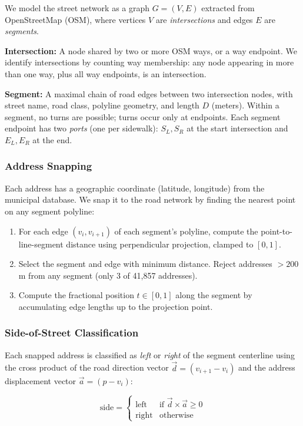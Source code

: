 \documentclass[conference]{IEEEtran}
\begin{document}
We model the street network as a graph $G = (V, E)$ extracted from OpenStreetMap (OSM), where vertices $V$ are \emph{intersections} and edges $E$ are \emph{segments}.

\textbf{Intersection:} A node shared by two or more OSM ways, or a way endpoint. We identify intersections by counting way membership: any node appearing in more than one way, plus all way endpoints, is an intersection.

\textbf{Segment:} A maximal chain of road edges between two intersection nodes, with street name, road class, polyline geometry, and length $D$ (meters). Within a segment, no turns are possible; turns occur only at endpoints. Each segment endpoint has two \emph{ports} (one per sidewalk): $S_L, S_R$ at the start intersection and $E_L, E_R$ at the end.

\subsubsection{Address Snapping}

Each address has a geographic coordinate (latitude, longitude) from the municipal database. We snap it to the road network by finding the nearest point on any segment polyline:

\begin{enumerate}
\item For each edge $(v_i, v_{i+1})$ of each segment's polyline, compute the point-to-line-segment distance using perpendicular projection, clamped to $[0,1]$.
\item Select the segment and edge with minimum distance. Reject addresses $> 200$\,m from any segment (only 3 of 41,857 addresses).
\item Compute the fractional position $t \in [0,1]$ along the segment by accumulating edge lengths up to the projection point.
\end{enumerate}

\subsubsection{Side-of-Street Classification}

Each snapped address is classified as \emph{left} or \emph{right} of the segment centerline using the cross product of the road direction vector $\vec{d} = (v_{i+1} - v_i)$ and the address displacement vector $\vec{a} = (p - v_i)$:

\begin{equation}
\text{side} = \begin{cases} \text{left} & \text{if } \vec{d} \times \vec{a} \geq 0 \\ \text{right} & \text{otherwise} \end{cases}
\label{eq:side}
\end{equation}
\end{document}
